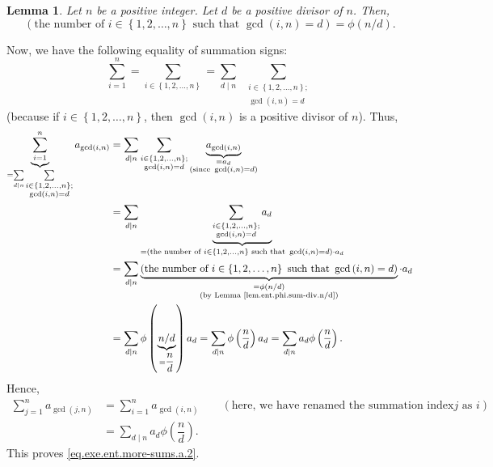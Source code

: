 \documentclass[paper=a4, fontsize=12pt]{scrartcl}%
\let\sumnonlimits\sum
\renewcommand{\sum}{\sumnonlimits\limits}
\theoremstyle{plainsl}
\newtheorem{lemma}[theorem]{Lemma}
\theoremstyle{definition}
\theoremstyle{remark}
\begin{document}
\begin{lemma}
\label{lem.ent.phi.sum-div.n/d}Let $n$ be a positive integer. Let $d$ be a
positive divisor of $n$. Then,%
\[
\left(  \text{the number of }i\in\left\{  1,2,\ldots,n\right\}  \text{ such
that }\gcd\left(  i,n\right)  =d\right)  =\phi\left(  n/d\right)  .
\]

\end{lemma}

Now, we have the following equality of summation signs:%
\[
\sum_{i=1}^{n}=\sum_{i\in\left\{  1,2,\ldots,n\right\}  }=\sum_{d\mid
n}\ \ \sum_{\substack{i\in\left\{  1,2,\ldots,n\right\}  ;\\\gcd\left(
i,n\right)  =d}}
\]
(because if $i\in\left\{  1,2,\ldots,n\right\}  $, then $\gcd\left(
i,n\right)  $ is a positive divisor of $n$). Thus,%
\begin{align*}
\underbrace{\sum_{i=1}^{n}}_{=\sum_{d\mid n}\sum_{\substack{i\in\left\{
1,2,\ldots,n\right\}  ;\\\gcd\left(  i,n\right)  =d}}}a_{\gcd\left(
i,n\right)  }  &  =\sum_{d\mid n}\sum_{\substack{i\in\left\{  1,2,\ldots
,n\right\}  ;\\\gcd\left(  i,n\right)  =d}}\underbrace{a_{\gcd\left(
i,n\right)  }}_{\substack{=a_{d}\\\text{(since }\gcd\left(  i,n\right)
=d\text{)}}}\\
&  =\sum_{d\mid n}\underbrace{\sum_{\substack{i\in\left\{  1,2,\ldots
,n\right\}  ;\\\gcd\left(  i,n\right)  =d}}a_{d}}_{=\left(  \text{the number
of }i\in\left\{  1,2,\ldots,n\right\}  \text{ such that }\gcd\left(
i,n\right)  =d\right)  \cdot a_{d}}\\
&  =\sum_{d\mid n}\underbrace{\left(  \text{the number of }i\in\left\{
1,2,\ldots,n\right\}  \text{ such that }\gcd\left(  i,n\right)  =d\right)
}_{\substack{=\phi\left(  n/d\right)  \\\text{(by Lemma
\ref{lem.ent.phi.sum-div.n/d})}}}\cdot a_{d}\\
&  =\sum_{d\mid n}\phi\left(  \underbrace{n/d}_{=\dfrac{n}{d}}\right)
a_{d}=\sum_{d\mid n}\phi\left(  \dfrac{n}{d}\right)  a_{d}=\sum_{d\mid n}%
a_{d}\phi\left(  \dfrac{n}{d}\right)  .
\end{align*}
Hence,%
\begin{align*}
\sum_{j=1}^{n}a_{\gcd\left(  j,n\right)  }  &  =\sum_{i=1}^{n}a_{\gcd\left(
i,n\right)  }\qquad\left(  \text{here, we have renamed the summation index
}j\text{ as }i\right) \\
&  =\sum_{d\mid n}a_{d}\phi\left(  \dfrac{n}{d}\right)  .
\end{align*}
This proves \eqref{eq.exe.ent.more-sums.a.2}.
\end{document}
